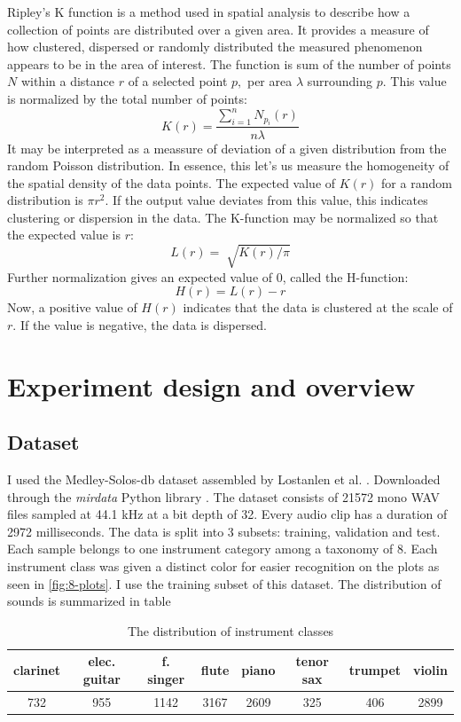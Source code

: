 \documentclass[a4paper, 12pt, twoside]{report}
\begin{document}
Ripley's K function is a method used in spatial analysis to describe how a collection of points are distributed over a given area. It provides a measure of how clustered, dispersed or randomly distributed the measured phenomenon appears to be in the area of interest. The function is sum of the number of points $N$ within a distance $r$ of a selected point $p,$ per area \(\lambda\) surrounding $p.$ This value is normalized by the total number of points:
\[K(r) = \frac{\sum_{i=1}^{n}N_{p_{i}}(r)}{n \lambda}\]
It may be interpreted as a meassure of deviation of a given distribution from the random Poisson distribution. In essence, this let's us measure the homogeneity of the spatial density of the data points. The expected value of \(K(r)\) for a random distribution is \(\pi r^{2}\). If the output value deviates from this value, this indicates clustering or dispersion in the data. The K-function may be normalized so that the expected value is $r$:
\[L(r) = \sqrt[]{K(r)/\pi}\]
Further normalization gives an expected value of 0, called the H-function:
\[H(r) = L(r) - r\]
Now, a positive value of \(H(r)\) indicates that the data is clustered at the scale of $r$. If the value is negative, the data is dispersed.

\newpage

\chapter{Experiment design and overview}
\label{sec:orga220b5b}
\section{Dataset}
\label{sec:orgac308b8}

I used the Medley-Solos-db dataset assembled by Lostanlen et al. \cite{medley}. Downloaded through the \textit{ mirdata } Python library \cite{bittner_fuentes_2019}. The dataset consists of 21572 mono WAV files sampled at 44.1 kHz at a bit depth of 32. Every audio clip has a duration of 2972 milliseconds. The data is split into 3 subsets: training, validation and test. Each sample belongs to one instrument category among a taxonomy of 8. Each instrument class was given a distinct color for easier recognition on the plots as seen in \ref{fig:8-plots}. I use the training subset of this dataset. The distribution of sounds is summarized in table \

\begin{table}[h!b]
\centering
\begin{tabular}{ |c|c|c|c|c|c|c|c| }
\hline
clarinet & elec. guitar & f. singer & flute & piano & tenor sax & trumpet & violin \\
\hline
732 & 955 & 1142 & 3167 & 2609 & 325 & 406 & 2899 \\
\hline
\end{tabular}
\caption{\label{table:distr_of_sounds}The distribution of instrument classes}
\end{table}
\end{document}
